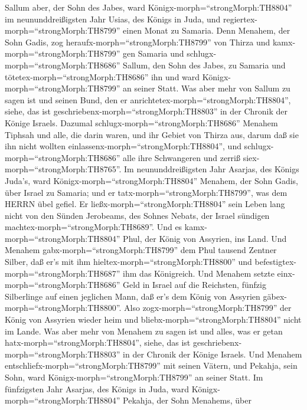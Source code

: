  Sallum aber, der Sohn des Jabes, ward
Königx-morph=``strongMorph:TH8804'' im neununddreißigsten Jahr Usias,
des Königs in Juda, und regiertex-morph=``strongMorph:TH8799'' einen
Monat zu Samaria.  Denn Menahem, der Sohn Gadis, zog
heraufx-morph=``strongMorph:TH8799'' von Thirza und
kamx-morph=``strongMorph:TH8799'' gen Samaria und
schlugx-morph=``strongMorph:TH8686'' Sallum, den Sohn des Jabes, zu
Samaria und tötetex-morph=``strongMorph:TH8686'' ihn und ward
Königx-morph=``strongMorph:TH8799'' an seiner Statt.  Was
aber mehr von Sallum zu sagen ist und seinen Bund, den er
anrichtetex-morph=``strongMorph:TH8804'', siehe, das ist
geschriebenx-morph=``strongMorph:TH8803'' in der Chronik der Könige
Israels.  Dazumal schlugx-morph=``strongMorph:TH8686''
Menahem Tiphsah und alle, die darin waren, und ihr Gebiet von Thirza
aus, darum daß sie ihn nicht wollten
einlassenx-morph=``strongMorph:TH8804'', und
schlugx-morph=``strongMorph:TH8686'' alle ihre Schwangeren und zerriß
siex-morph=``strongMorph:TH8765''.  Im neununddreißigsten
Jahr Asarjas, des Königs Juda's, ward
Königx-morph=``strongMorph:TH8804'' Menahem, der Sohn Gadis, über Israel
zu Samaria;  und er tatx-morph=``strongMorph:TH8799'', was
dem HERRN übel gefiel. Er ließx-morph=``strongMorph:TH8804'' sein Leben
lang nicht von den Sünden Jerobeams, des Sohnes Nebats, der Israel
sündigen machtex-morph=``strongMorph:TH8689''.  Und es
kamx-morph=``strongMorph:TH8804'' Phul, der König von Assyrien, ins
Land. Und Menahem gabx-morph=``strongMorph:TH8799'' dem Phul tausend
Zentner Silber, daß er's mit ihm hieltex-morph=``strongMorph:TH8800''
und befestigtex-morph=``strongMorph:TH8687'' ihm das Königreich.
 Und Menahem setzte einx-morph=``strongMorph:TH8686'' Geld
in Israel auf die Reichsten, fünfzig Silberlinge auf einen jeglichen
Mann, daß er's dem König von Assyrien
gäbex-morph=``strongMorph:TH8800''. Also
zogx-morph=``strongMorph:TH8799'' der König von Assyrien wieder heim und
bliebx-morph=``strongMorph:TH8804'' nicht im Lande.  Was
aber mehr von Menahem zu sagen ist und alles, was er getan
hatx-morph=``strongMorph:TH8804'', siehe, das ist
geschriebenx-morph=``strongMorph:TH8803'' in der Chronik der Könige
Israels.  Und Menahem
entschliefx-morph=``strongMorph:TH8799'' mit seinen Vätern, und Pekahja,
sein Sohn, ward Königx-morph=``strongMorph:TH8799'' an seiner Statt.
 Im fünfzigsten Jahr Asarjas, des Königs in Juda, ward
Königx-morph=``strongMorph:TH8804'' Pekahja, der Sohn Menahems, über
